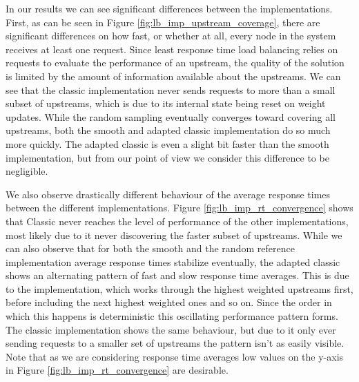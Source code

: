 In our results we can see significant differences between the implementations.
First, as can be seen in Figure \ref{fig:lb_imp_upstream_coverage}, there are significant differences on how fast, or whether at all, every node in the system receives at least one request.
Since least response time load balancing relies on requests to evaluate the performance of an upstream, the quality of the solution is limited by the amount of information available about the upstreams.
We can see that the classic implementation never sends requests to more than a small subset of upstreams, which is due to its internal state being reset on weight updates.
While the random sampling eventually converges toward covering all upstreams, both the smooth and adapted classic implementation do so much more quickly.
The adapted classic is even a slight bit faster than the smooth implementation, but from our point of view we consider this difference to be negligible.

We also observe drastically different behaviour of the average response times between the different implementations.
Figure \ref{fig:lb_imp_rt_convergence} shows that Classic never reaches the level of performance of the other implementations, most likely due to it never discovering the faster subset of upstreams.
While we can also observe that for both the smooth and the random reference implementation average response times stabilize eventually, the adapted classic shows an alternating pattern of fast and slow response time averages.
This is due to the implementation, which works through the highest weighted upstreams first, before including the next highest weighted ones and so on.
Since the order in which this happens is deterministic this oscillating performance pattern forms.
The classic implementation shows the same behaviour, but due to it only ever sending requests to a smaller set of upstreams the pattern isn't as easily visible.
Note that as we are considering response time averages low values on the y-axis in Figure \ref{fig:lb_imp_rt_convergence} are desirable.

























